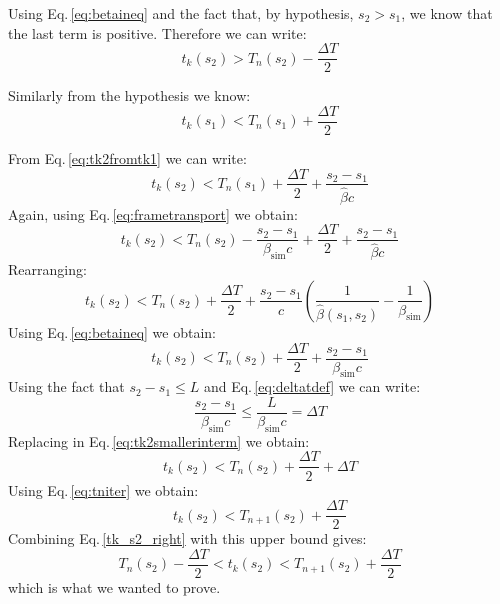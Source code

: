 Using Eq.\,\ref{eq:betaineq} and the fact that, by hypothesis, $s_2 > s_1$, we know that the last term is positive. Therefore we can write:
\begin{equation}
t_k(s_2) > T_n(s_2) - \frac{\Delta T}{2}
\label{tk_s2_right}
\end{equation}

Similarly from the hypothesis we know:
\begin{equation}
t_k(s_1) < T_n(s_1) + \frac{\Delta T}{2}
\end{equation}

From Eq.\,\ref{eq:tk2fromtk1} we can write:
\begin{equation}
t_k(s_2) < T_n(s_1) + \frac{\Delta T}{2} + \frac{s_2 - s_1}{\hat{\beta} c}
\end{equation}
Again, using Eq.\,\ref{eq:frametransport} we obtain:
\begin{equation}
t_k(s_2) < T_n(s_2) - \frac{s_2 - s_1}{{\beta}_\text{sim} c}  + \frac{\Delta T}{2} + \frac{s_2 - s_1}{\hat{\beta} c}
\end{equation}
Rearranging:
\begin{equation}
t_k(s_2) < T_n(s_2) + \frac{\Delta T}{2} + \frac{s_2 - s_1}{c} \left(
\frac{1}{\hat{\beta}(s_1,s_2)} - \frac{1}{\beta_\text{sim}}
\right)
\end{equation}
Using Eq.\,\ref{eq:betaineq} we obtain:
\begin{equation}
t_k(s_2) < T_n(s_2) + \frac{\Delta T}{2} + \frac{s_2 - s_1}{\beta_\text{sim}c}
\label{eq:tk2smallerinterm}
\end{equation}
Using the fact that $s_2 - s_1 \leq L$ and Eq.\,\ref{eq:deltatdef} we can write:
\begin{equation}
\frac{s_2 - s_1}{\beta_\text{sim}c} \leq \frac{L}{\beta_\text{sim}c} = \Delta T
\end{equation}
Replacing in Eq.\,\ref{eq:tk2smallerinterm} we obtain:
\begin{equation}
t_k(s_2) < T_n(s_2) + \frac{\Delta T}{2} + \Delta T
\end{equation}
Using Eq.\,\ref{eq:tniter} we obtain:
\begin{equation}
t_k(s_2) < T_{n+1}(s_2) + \frac{\Delta T}{2}
\end{equation}
Combining Eq.\,\ref{tk_s2_right} with this upper bound gives:
\begin{equation}
T_{n}(s_2) - \frac{\Delta T}{2} < t_k(s_2) < T_{n+1}(s_2) + \frac{\Delta T}{2}
\end{equation}
which is what we wanted to prove.

